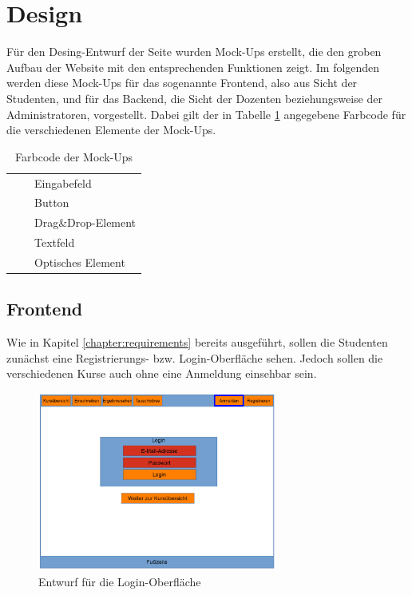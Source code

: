     \section{Design}
        Für den Desing-Entwurf der Seite wurden Mock-Ups erstellt, die den groben Aufbau der Website mit den entsprechenden Funktionen zeigt. 
        Im folgenden werden diese Mock-Ups für das sogenannte Frontend, also aus Sicht der Studenten, und für das Backend, die Sicht der Dozenten beziehungsweise der Administratoren, vorgestellt.
        Dabei gilt der in Tabelle \ref{tab:Farbcode} angegebene Farbcode für die verschiedenen Elemente der Mock-Ups.
        \begin{table}
            \centering
            \begin{tabular}{l c| l}
                \cellcolor{red} & & Eingabefeld\\
                \cellcolor{orange} & & Button\\
                \cellcolor{olive} & & Drag\&Drop-Element\\
                \cellcolor{green} & & Textfeld\\
                \cellcolor{blue} & & Optisches Element
            \end{tabular}
            \caption{Farbcode der Mock-Ups}
            \label{tab:Farbcode}
        \end{table}
    
        \subsection{Frontend}
            Wie in Kapitel \ref{chapter:requirements} bereits ausgeführt, sollen die Studenten zunächst eine Registrierungs- bzw. Login-Oberfläche sehen.
            Jedoch sollen die verschiedenen Kurse auch ohne eine Anmeldung einsehbar sein.
            \begin{figure}[t]
            	\centering
            	\includegraphics[width=0.7\textwidth]{./design/images/MockUpsFrontend/frontendLogin.png}
            	\caption{Entwurf für die Login-Oberfläche}
            	\label{mockupLoginFrontend}
            \end{figure}   
        
